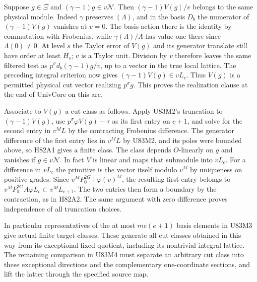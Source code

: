 Suppose $g\in\Xi$ and $(\gamma-1)g\in v\mathcal N$. Then
$(\gamma-1)V(g)/v$ belongs to the same physical module. Indeed
$\gamma$ preserves $(\Lambda)$, and in the basis $D_b$ the
numerator of $(\gamma-1)V(g)$ vanishes at $v=0$. The basis
action there is the identity by commutation with Frobenius,
while $\gamma(\Lambda)/\Lambda$ has value one there since
$\Lambda(0)\ne0$. At level $s$ the Taylor error of $V(g)$
and its generator translate still have order at least $H_s$;
$v$ is a Taylor unit. Division by $v$ therefore leaves the
same filtered test as $p^\sigma d_b(\gamma-1)g/v$, up to a
vector in the true local lattice. The preceding integral criterion
now gives $(\gamma-1)V(g)\in vL_c$. Thus $V(g)$ is a permitted
physical cut vector realizing $p^\sigma g$. This proves the
realization clause at the end of $\mathrm{UnivCore}$ on this arc.

Associate to $V(g)$ a cut class as follows. Apply U83M2's
truncation to $(\gamma-1)V(g)$, use
$p^\sigma\varphi V(g)-\tau$ as its first entry on $c+1$, and
solve for the second entry in $v^ML$ by the contracting
Frobenius difference. The generator difference of the first entry
lies in $v^ML$ by U83M2, and its poles were bounded above, so
H82A1 gives a finite class. The class depends $O$-linearly on
$g$ and vanishes if $g\in v\mathcal N$. In fact $V$ is linear
and maps that submodule into $vL_c$. For a difference in $vL_c$
the primitive is the vector itself modulo $v^M$ by uniqueness on
positive grades. Since $v^MP_0^{2G}\mid\varphi(v)^M$, the resulting
first entry belongs to $v^MP_0^{2G}A\varphi L_c\subset v^ML_{c+1}$.
The two entries then form a boundary by the contraction, as in
H82A2. The same argument with zero difference proves independence
of all truncation choices.

In particular representatives of the at most $me(e+1)$ basis
elements in U83M3 give actual finite target classes. These generate
all cut classes obtained in this way from its exceptional fixed
quotient, including its nontrivial integral lattice. The remaining
comparison in U83M4 must separate an arbitrary cut class into
these exceptional directions and the complementary one-coordinate
sections, and lift the latter through the specified source map.
